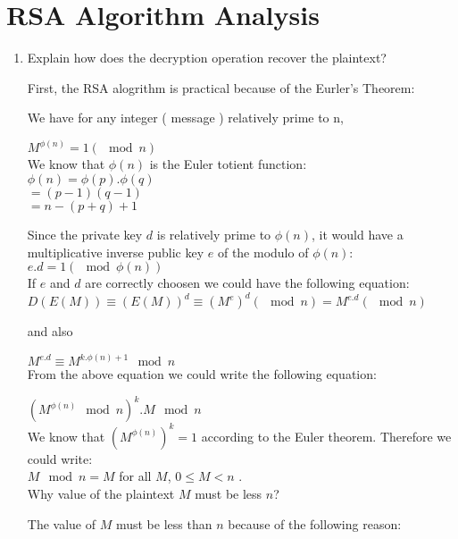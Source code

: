 \documentclass[12]{article}
\begin{document}
\section{ RSA Algorithm Analysis }	

\begin{enumerate}
	\item Explain how does the decryption operation recover the plaintext?
	
	First, the RSA alogrithm is practical because of the  Eurler's Theorem: 
	
	We have for any integer ( message ) relatively prime to n, 
	
	
	$M^{\phi(n)} = 1 ( \mod n )$ \\	
	
	We know that $\phi(n)$ is the Euler totient function: \\ 
	$\phi(n) =  \phi(p).\phi(q)$\\
	$= (p - 1)(q - 1)$\\
	$= n - ( p + q ) + 1$
	
	Since the private key $d$ is relatively prime to $\phi(n)$, it would have a multiplicative  inverse public key $e$ of the modulo of $\phi(n)$: \\
	
	$e.d = 1 ( \mod \phi(n))$ \\
	
	
	If $e$ and $d$ are correctly choosen we could have the following equation: \\
	$D(E(M)) \equiv (E(M))^d \equiv (M^e)^d ( \mod n )  = M^{e.d} ( \mod n )$
	
	and also
	
	$M^{e.d} \equiv M^{k.\phi(n) + 1 } \mod n $ \\
	
	From the above equation we could write the following equation: 
	
	$( M^{\phi(n)} \mod n )^k . M \mod n$ \\
	
	We know that  $( M^{\phi(n)} )^k = 1 $ according to the Euler theorem. Therefore we could write: \\
	
	$M \mod n = M $  for all $M$, $ 0 \leq M  < n$ . \\
	
	 Why value of the plaintext $M$ must be less $n$?
	 
	 The value of $M$ must be less than $n$ because of the following reason: \\
	 

\end{enumerate}
\end{document}
